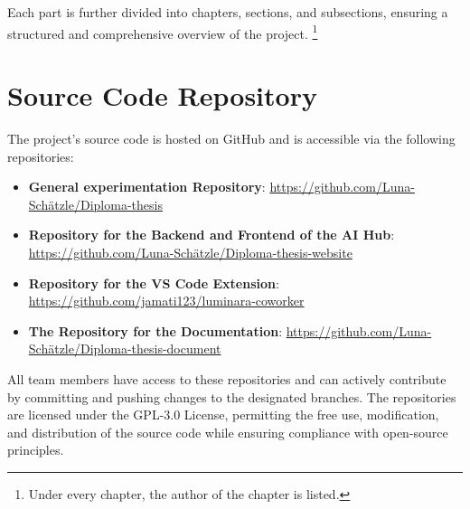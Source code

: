 Each part is further divided into chapters, sections, and subsections, ensuring a structured and comprehensive overview of the project.
\footnote{Under every chapter, the author of the chapter is listed.}


\section{Source Code Repository}

The project's source code is hosted on GitHub and is accessible via the following repositories:

\begin{itemize}
    \item \textbf{General experimentation Repository}: \url{https://github.com/Luna-Schätzle/Diploma-thesis}
    \item \textbf{Repository for the Backend and Frontend of the AI Hub}: \url{https://github.com/Luna-Schätzle/Diploma-thesis-website}
    \item \textbf{Repository for the VS Code Extension}: \url{https://github.com/jamati123/luminara-coworker}
    \item \textbf{The Repository for the Documentation}: \url{https://github.com/Luna-Schätzle/Diploma-thesis-document}
\end{itemize}

All team members have access to these repositories and can actively contribute by committing and pushing changes to the designated branches. The repositories are licensed under the GPL-3.0 License, permitting the free use, modification, and distribution of the source code while ensuring compliance with open-source principles.